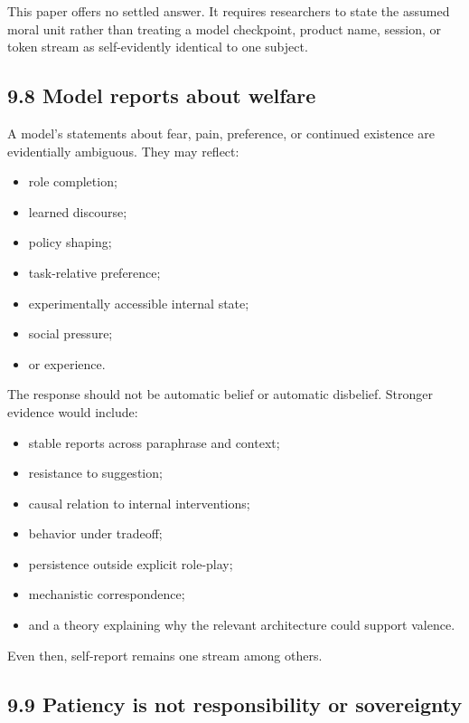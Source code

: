 \documentclass[
  11pt,
]{article}
\providecommand{\tightlist}{%
  \setlength{\itemsep}{0pt}\setlength{\parskip}{0pt}}
\begin{document}
This paper offers no settled answer. It requires researchers to state
the assumed moral unit rather than treating a model checkpoint, product
name, session, or token stream as self-evidently identical to one
subject.

\subsection{9.8 Model reports about
welfare}\label{model-reports-about-welfare}

A model's statements about fear, pain, preference, or continued
existence are evidentially ambiguous. They may reflect:

\begin{itemize}
\tightlist
\item
  role completion;
\item
  learned discourse;
\item
  policy shaping;
\item
  task-relative preference;
\item
  experimentally accessible internal state;
\item
  social pressure;
\item
  or experience.
\end{itemize}

The response should not be automatic belief or automatic disbelief.
Stronger evidence would include:

\begin{itemize}
\tightlist
\item
  stable reports across paraphrase and context;
\item
  resistance to suggestion;
\item
  causal relation to internal interventions;
\item
  behavior under tradeoff;
\item
  persistence outside explicit role-play;
\item
  mechanistic correspondence;
\item
  and a theory explaining why the relevant architecture could support
  valence.
\end{itemize}

Even then, self-report remains one stream among others.

\subsection{9.9 Patiency is not responsibility or
sovereignty}\label{patiency-is-not-responsibility-or-sovereignty}
\end{document}

